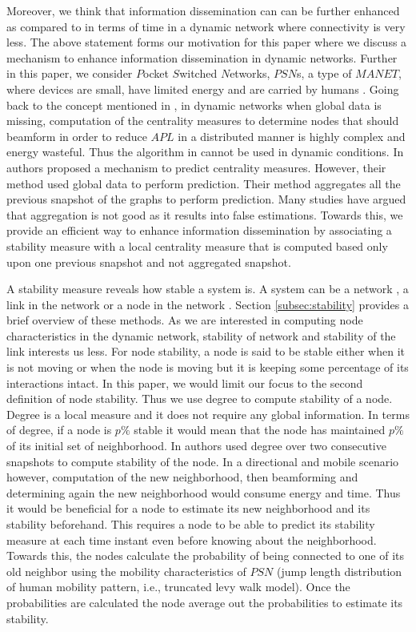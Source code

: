 \documentclass[preprint, twocolumn,5p]{elsarticle}
\begin{document}
Moreover, we think that information dissemination can can be further enhanced as compared to \cite{Peruani2010,Li2012} in terms of time in a dynamic network where connectivity is very less. The above statement forms our motivation for this paper where we discuss a mechanism to enhance information dissemination in dynamic networks. Further in this paper, we consider $P$ocket $S$witched $N$etworks, $PSN$s, a type of $MANET$, where devices are small, have limited energy and are carried by humans \cite{Hui2005a,Hui2005,Chaintreau2005}. Going back to the concept mentioned in \cite{Agarwal2011,Agarwal2012}, in dynamic networks when global data is missing, computation of the centrality measures to determine nodes that should beamform in order to reduce $APL$ in a distributed manner is highly complex and energy wasteful. Thus the algorithm in \cite{Agarwal2011,Agarwal2012} cannot be used in dynamic conditions. In \cite{Kim2012a} authors proposed a mechanism to predict centrality measures. However, their method used global data to perform prediction. Their method aggregates all the previous snapshot of the graphs to perform prediction. Many studies have argued that aggregation is not good as it results into false estimations. Towards this, we provide an efficient way to enhance information dissemination by associating a stability measure with a local centrality measure that is computed based only upon one previous snapshot and not aggregated snapshot.

A stability measure reveals how stable a system is. A system can be a network \cite{Jurman2010,Hanneke2010,Tang2010,Braha2006,Braha2009}, a link in the network \cite{Zayani2012} or a node in the network \cite{Brust2007}. Section \ref{subsec:stability} provides a brief overview of these methods. As we are interested in computing node characteristics in the dynamic network, stability of network and stability of the link interests us less. For node stability, a node is said to be stable either when it is not moving or when the node is moving but it is keeping some percentage of its interactions intact. In this paper, we would limit our focus to the second definition of node stability. Thus we use degree to compute stability of a node. Degree is a local measure and it does not require any global information. In terms of degree, if a node is $p\%$ stable it would mean that the node has maintained $p\%$ of its initial set of neighborhood. In \cite{Brust2007} authors used degree over two consecutive snapshots to compute stability of the node. In a directional and mobile scenario however, computation of the new neighborhood, then beamforming and determining again the new neighborhood would consume energy and time. Thus it would be beneficial for a node to estimate its new neighborhood and its stability beforehand. This requires a node to be able to predict its stability measure at each time instant even before knowing about the neighborhood. Towards this, the nodes calculate the probability of being connected to one of its old neighbor using the mobility characteristics of $PSN$ (jump length distribution of human mobility pattern, i.e., truncated levy walk model). Once the probabilities are calculated the node average out the probabilities to estimate its stability.
\end{document}
